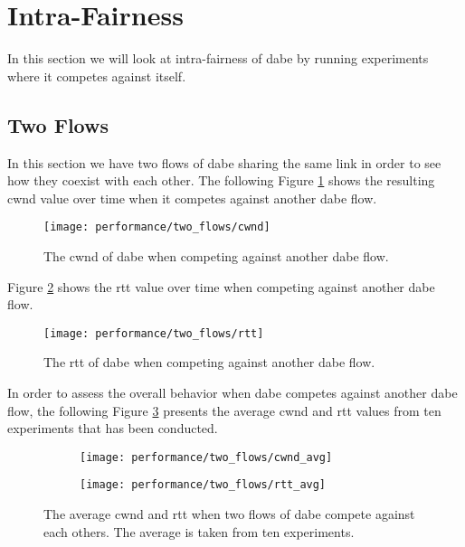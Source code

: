 \section{Intra-Fairness} \label{sec:intra-fair}

In this section we will look at intra-fairness of \gls{dabe} by running experiments where it competes against itself.

\subsection{Two Flows}

In this section we have two flows of \gls{dabe} sharing the same link in order to see how they coexist with each other. The following Figure \ref{fig:dabe_vs_dabe_cwnd} shows the resulting \gls{cwnd} value over time when it competes against another \gls{dabe} flow.

\begin{figure}[H]
    \centering
    \texttt{[image: performance/two\_flows/cwnd]}
    \captionsetup{width=1.0\linewidth}
    \caption{The \gls{cwnd} of \gls{dabe} when competing against another \gls{dabe} flow.}
    \label{fig:dabe_vs_dabe_cwnd}
\end{figure}

Figure \ref{fig:dabe_vs_dabe_rtt} shows the \gls{rtt} value over time when competing against another \gls{dabe} flow.

\begin{figure}[H]
    \centering
    \texttt{[image: performance/two\_flows/rtt]}
    \captionsetup{width=1.0\linewidth}
    \caption{The \gls{rtt} of \gls{dabe} when competing against another \gls{dabe} flow.}
    \label{fig:dabe_vs_dabe_rtt}
\end{figure}

In order to assess the overall behavior when \gls{dabe} competes against another \gls{dabe} flow, the following Figure \ref{fig:dabe_vs_dabe_avg} presents the average \gls{cwnd} and \gls{rtt} values from ten experiments that has been conducted.

\begin{figure}[H]
    \centering
    \begin{subfigure}{0.5\linewidth}
        \centering
        \texttt{[image: performance/two\_flows/cwnd\_avg]}
    \end{subfigure}%
    \begin{subfigure}{0.5\linewidth}
        \centering
        \texttt{[image: performance/two\_flows/rtt\_avg]}
    \end{subfigure}
    \caption{The average \gls{cwnd} and \gls{rtt} when two flows of \gls{dabe} compete against each others. The average is taken from ten experiments.}
    \label{fig:dabe_vs_dabe_avg}
\end{figure}

